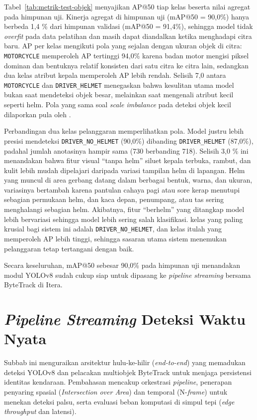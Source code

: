 Tabel~\ref{tab:metrik-test-objek} menyajikan AP@50 tiap kelas beserta nilai agregat pada himpunan uji. Kinerja agregat di himpunan uji (mAP@50 = 90,0\%) hanya berbeda 1,4 \% dari himpunan validasi (mAP@50 = 91,4\%), sehingga model tidak \textit{overfit} pada data pelatihan dan masih dapat diandalkan ketika menghadapi citra baru. AP per kelas mengikuti pola yang sejalan dengan ukuran objek di citra: \texttt{MOTORCYCLE} memperoleh AP tertinggi 94,0\% karena badan motor mengisi piksel dominan dan bentuknya relatif konsisten dari satu citra ke citra lain, sedangkan dua kelas atribut kepala memperoleh AP lebih rendah. Selisih 7,0  antara \texttt{MOTORCYCLE} dan \texttt{DRIVER\_HELMET} menegaskan bahwa kesulitan utama model bukan saat mendeteksi objek besar, melainkan saat mengenali atribut kecil seperti helm. Pola yang sama soal \textit{scale imbalance} pada deteksi objek kecil dilaporkan pula oleh \cite{oksuz2020imbalance}.

Perbandingan dua kelas pelanggaran memperlihatkan pola. Model justru lebih presisi mendeteksi \texttt{DRIVER\_NO\_HELMET} (90,0\%) dibanding \texttt{DRIVER\_HELMET} (87,0\%), padahal jumlah anotasinya hampir sama (730 berbanding 718). Selisih 3,0 \% ini menandakan bahwa fitur visual ``tanpa helm'' siluet kepala terbuka, rambut, dan kulit lebih mudah dipelajari daripada variasi tampilan helm di lapangan. Helm yang muncul di area gerbang datang dalam berbagai bentuk, warna, dan ukuran, variasinya bertambah karena pantulan cahaya pagi atau sore kerap menutupi sebagian permukaan helm, dan kaca depan, penumpang, atau tas sering menghalangi sebagian helm. Akibatnya, fitur ``berhelm'' yang ditangkap model lebih bervariasi sehingga model lebih sering salah klasifikasi.  kelas yang paling krusial bagi sistem ini adalah \texttt{DRIVER\_NO\_HELMET}, dan kelas itulah yang memperoleh AP lebih tinggi, sehingga sasaran utama sistem menemukan pelanggaran tetap tertangani dengan baik.

Secara keseluruhan, mAP@50 sebesar 90,0\% pada himpunan uji menandakan modul YOLOv8 sudah cukup siap untuk dipasang ke \textit{pipeline} \textit{streaming} bersama ByteTrack di Itera.

\section{\textit{Pipeline Streaming} Deteksi Waktu Nyata}
\label{sec:integrasi-pipeline}
 Subbab ini menguraikan arsitektur hulu-ke-hilir (\textit{end-to-end}) yang memadukan deteksi YOLOv8 dan pelacakan multiobjek ByteTrack untuk menjaga persistensi identitas kendaraan. Pembahasan mencakup orkestrasi \textit{pipeline}, penerapan penyaring spasial (\textit{Intersection over Area}) dan temporal (N-\textit{frame}) untuk menekan deteksi palsu, serta evaluasi beban komputasi di simpul tepi (\textit{edge throughput} dan latensi).

